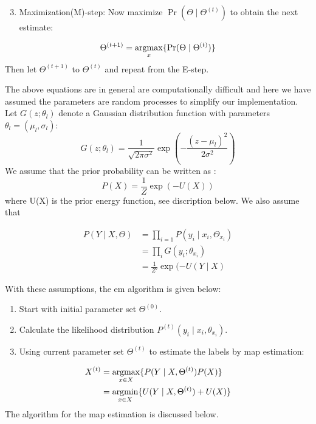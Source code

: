 \begin{enumerate}
	\setcounter{enumi}{2}
	\item Maximization(M)-step: Now maximize \(\Pr(\Theta \mid \Theta^{(t)})\) to obtain the next
	estimate:
\end{enumerate}
\begin{equation}
\Theta^{(t+1)}=\operatorname*{argmax}_x\{\Pr(\Theta \mid \Theta^{(t)})\} 
\end{equation}
Then let \(\Theta^{(t+1)}\) to  \(\Theta^{(t)}\) and repeat from the E-step.

The above equations are in general are computationally difficult and here we have assumed the parameters are random processes to simplify our implementation\cite{monfrini2003image}. Let \(G(z;\theta_l)\) denote a Gaussian distribution function with parameters \(\theta_l=(\mu_l,\sigma_l)\):
\begin{equation}
G(z;\theta_l)= \frac{1}{\sqrt{2\pi\sigma^2}}\exp(-\frac{(z-\mu_l)^2}{2\sigma^2})   
\end{equation}
We assume that the prior probability can be written as \cite{sandberg2004markov}:
\begin{equation}
P(X)=\frac{1}{Z}\exp{(-U(X))}  
\end{equation}
where U(X) is the prior energy function, see discription below. We also assume that


\begin{equation}\label{eq2}
\begin{split}
P( Y \mid X,\Theta) & =\prod_{i=1}^{ }P( y_i \mid x_i,\Theta_{x_i})\\
& =\prod_{i}^{ }G(y_i;\theta_{x_i})\\
& =\frac{1}{Z'}\exp{(-U(Y \mid X)} 
\end{split}
\end{equation}

With these assumptions, the \gls{em} algorithm is given below:

\begin{enumerate}
	\item Start with initial parameter set \(\Theta^{(0)}\).
	\item Calculate the likelihood distribution \(P^{(t)}(y_i \mid x_i,\theta_{x_i})\).
	\item Using current parameter set \(\Theta^{(t)}\) to estimate the labels
	by \gls {map} estimation:
\end{enumerate}

\begin{equation}
\begin{split}
X^{(t)} & =\operatorname*{argmax}_{x \in X}\{P( Y \mid X, \Theta^{(t)})P(X)\}\\
&= \operatorname*{argmin}_{x \in X} \{U( Y \mid X, \Theta^{(t)}) + U(X)\}
\end{split}
\end{equation}
The algorithm for the \gls {map} estimation is discussed below.

